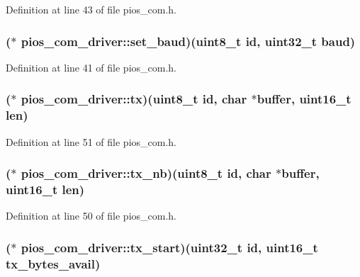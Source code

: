 Definition at line 43 of file pios\-\_\-com.\-h.

\hypertarget{structpios__com__driver_a71fc7a3baa59051532f8ea0184eb62c9}{
\subsubsection[{set\-\_\-baud}]{($\ast$ pios\-\_\-com\-\_\-driver\-::set\-\_\-baud)({\bf uint8\-\_\-t} {\bf id}, {\bf uint32\-\_\-t} baud)}}\label{structpios__com__driver_a71fc7a3baa59051532f8ea0184eb62c9}


Definition at line 41 of file pios\-\_\-com.\-h.

\hypertarget{structpios__com__driver_a10cec315c74f4ad96f5045389b43fb2b}{
\subsubsection[{tx}]{($\ast$ pios\-\_\-com\-\_\-driver\-::tx)({\bf uint8\-\_\-t} {\bf id}, char $\ast$buffer, {\bf uint16\-\_\-t} {\bf len})}}\label{structpios__com__driver_a10cec315c74f4ad96f5045389b43fb2b}


Definition at line 51 of file pios\-\_\-com.\-h.

\hypertarget{structpios__com__driver_a841388fc4a328022ebc8c72461e1d2f6}{
\subsubsection[{tx\-\_\-nb}]{($\ast$ pios\-\_\-com\-\_\-driver\-::tx\-\_\-nb)({\bf uint8\-\_\-t} {\bf id}, char $\ast$buffer, {\bf uint16\-\_\-t} {\bf len})}}\label{structpios__com__driver_a841388fc4a328022ebc8c72461e1d2f6}


Definition at line 50 of file pios\-\_\-com.\-h.

\hypertarget{structpios__com__driver_a54751423be66aa5eeef4655f56ae656d}{
\subsubsection[{tx\-\_\-start}]{($\ast$ pios\-\_\-com\-\_\-driver\-::tx\-\_\-start)({\bf uint32\-\_\-t} {\bf id}, {\bf uint16\-\_\-t} tx\-\_\-bytes\-\_\-avail)}}\label{structpios__com__driver_a54751423be66aa5eeef4655f56ae656d}



